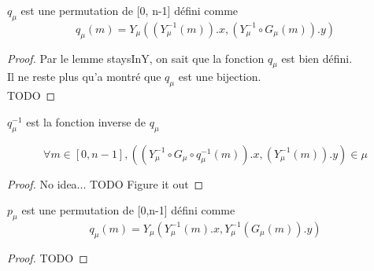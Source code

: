 \begin{definition}[qu]
    \label{qu}
    \leanok
    $q_{\mu}$ est une permutation de [0, n-1] défini comme
    \[ q_{\mu}(m)= Y_{\mu}((Y_{\mu}^{-1}(m)).x,(Y_{\mu}^{-1} \circ G_{\mu}(m)).y) \]
\end{definition}
\begin{proof}
    \leanok
    Par le lemme staysInY, on sait que la fonction $q_{\mu}$ est bien défini.\\
    Il ne reste plus qu'a montré que $q_{\mu}$ est une bijection.\\
    TODO
\end{proof}

\begin{definition}[quInv]
    \label{quInv}
    $q_{\mu}^{-1}$ est la fonction inverse de $q_{\mu}$
\end{definition}

\begin{lemma}[staysInX]
    \label{staysInX}
    \[ \forall m \in [0,n-1], ((Y_{\mu}^{-1} \circ G_{\mu} \circ q_{\mu}^{-1}(m)).x, (Y_{\mu}^{-1}(m)).y) \in \mu \]
\end{lemma}
\begin{proof}
    No idea...
    TODO Figure it out
\end{proof}

\begin{definition}[pu]
    \label{pu}
    $p_{\mu}$ est une permutation de [0,n-1] défini comme
    \[ q_{\mu}(m)= Y_{\mu}(Y_{\mu}^{-1}(m).x,Y_{\mu}^{-1}(G_{\mu}(m)).y) \]
\end{definition}
\begin{proof}
    TODO
    
\end{proof}

